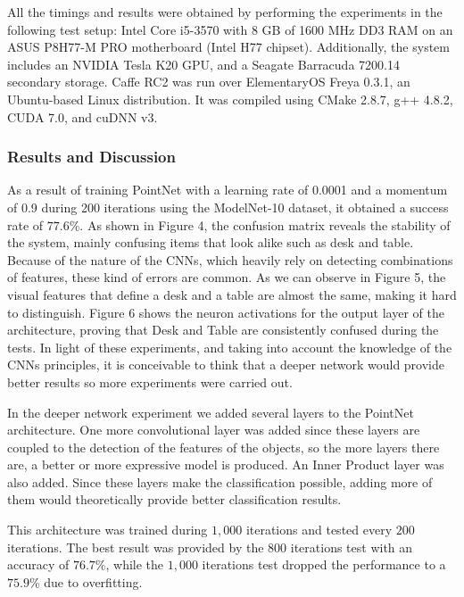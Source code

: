 All the timings and results were obtained by performing the experiments in the following test setup: Intel Core i5-3570 with 8 GB of 1600 MHz DD3 RAM on an ASUS P8H77-M PRO motherboard (Intel H77 chipset). Additionally, the system includes an NVIDIA Tesla K20 GPU, and a Seagate Barracuda 7200.14 secondary storage. Caffe RC2 was run over ElementaryOS Freya 0.3.1, an Ubuntu-based Linux distribution. It was compiled using CMake 2.8.7, g++ 4.8.2, CUDA 7.0, and cuDNN v3.


\subsubsection{Results and Discussion}
\label{cha:objrecog:sec:pointnet:subsec:discussion}

As a result of training PointNet with a learning rate of 0.0001 and a momentum of 0.9 during 200 iterations using the ModelNet-10 dataset, it obtained a success rate of $77.6$\%. As shown in Figure 4, the confusion matrix reveals the stability of the system, mainly confusing items that look alike such as desk and table. Because of the nature of the \acp{CNN}, which heavily rely on detecting combinations of features, these kind of errors are common. As we can observe in Figure 5, the visual features that define a desk and a table are almost the same, making it hard to distinguish. Figure 6 shows the neuron activations for the output layer of the architecture, proving that Desk and Table are consistently confused during the tests. In light of these experiments, and taking into account the knowledge of the \acp{CNN} principles, it is conceivable to think that a deeper network would provide better results so more experiments were carried out.

In the deeper network experiment we added several layers to the PointNet architecture. One more convolutional layer was added since these layers are coupled to the detection of the features of the objects, so the more layers there are, a better or more expressive model is produced. An Inner Product layer was also added. Since these layers make the classification possible, adding more of them would theoretically provide better classification results.

This architecture was trained during $1,000$ iterations and tested every $200$ iterations. The best result was provided by the $800$ iterations test with an accuracy of $76.7$\%, while the $1,000$ iterations test dropped the performance to a $75.9$\% due to overfitting.

